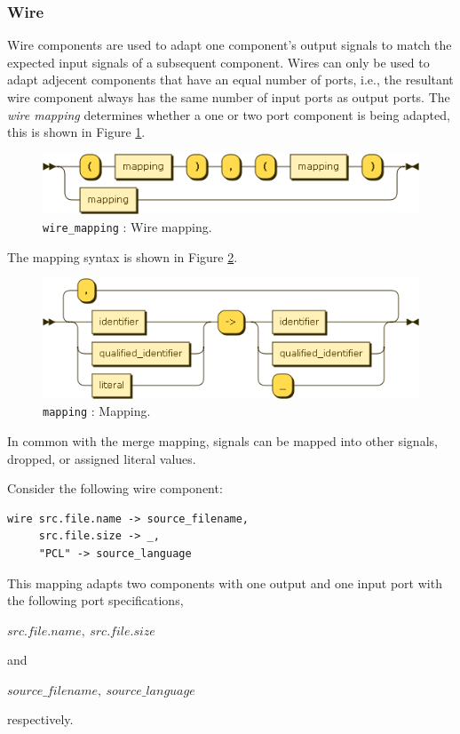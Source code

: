 \subsubsection{Wire}
Wire components are used to adapt one component's output signals to match the expected input signals of a subsequent component. Wires can only be used to adapt adjecent components that have an equal number of ports, i.e., the resultant wire component always has the same number of input ports as output ports. The \emph{wire mapping} determines whether a one or two port component is being adapted, this is shown in Figure \ref{fig:pcl-wire-mapping}.
\begin{figure}[h!]
  \centering
    \includegraphics[scale=\DiagramScale]{chapters/compiler/diagrams/wire_mapping}
  \caption{\texttt{wire\_mapping} : Wire mapping.}
  \label{fig:pcl-wire-mapping}
\end{figure}
The mapping syntax is shown in Figure \ref{fig:pcl-mapping}.
\begin{figure}[h!]
  \centering
    \includegraphics[scale=\DiagramScale]{chapters/compiler/diagrams/mapping}
  \caption{\texttt{mapping} : Mapping.}
  \label{fig:pcl-mapping}
\end{figure}
In common with the merge mapping, signals can be mapped into other signals, dropped, or assigned literal values.

Consider the following wire component:
\begin{center}
  \begin{verbatim}
wire src.file.name -> source_filename,
     src.file.size -> _,
     "PCL" -> source_language
  \end{verbatim}
\end{center}
This mapping adapts two components with one output and one input port with the following port specifications,
\begin{center}
$src.file.name,\ src.file.size$
\end{center}
and
\begin{center}
$source\_filename,\ source\_language$
\end{center}
respectively.

